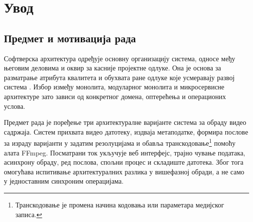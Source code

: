 \documentclass[12pt,oneside]{memoir}
\begin{document}
\frontmatter
\naslovna
\komisija
\begingroup
\setlength{\emergencystretch}{4em}
\apstrakt
\endgroup
\tableofcontents*

\mainmatter

\chapter{Увод}
\label{chp:uvod}
\begingroup
\setlength{\emergencystretch}{3em}

\section{Предмет и мотивација рада}

Софтверска архитектура одређује основну организацију система, односе међу
његовим деловима и оквир за касније пројектне одлуке. Она је основа за
разматрање атрибута квалитета и обухвата ране одлуке које усмеравају развој
система \cite{bass2012software}. Избор између монолита, модуларног монолита и
микросервисне архитектуре зато зависи од конкретног домена, оптерећења и
операционих услова.

Предмет рада је поређење три архитектуралне варијанте система за обраду видео
садржаја. Систем прихвата видео датотеку, издваја метаподатке, формира послове
за израду варијанти у задатим резолуцијама и обавља
транскодовање\footnote{Транскодовање је промена начина кодовања или параметара
	медијског записа.} помоћу алата {\lat FFmpeg}. Посматрани ток укључује веб
интерфејс, трајно чување података, асинхрону обраду, ред послова, спољни процес
и складиште датотека. Због тога омогућава испитивање архитектуралних разлика у
вишефазној обради, а не само у једноставним синхроним операцијама.

\end{document}
